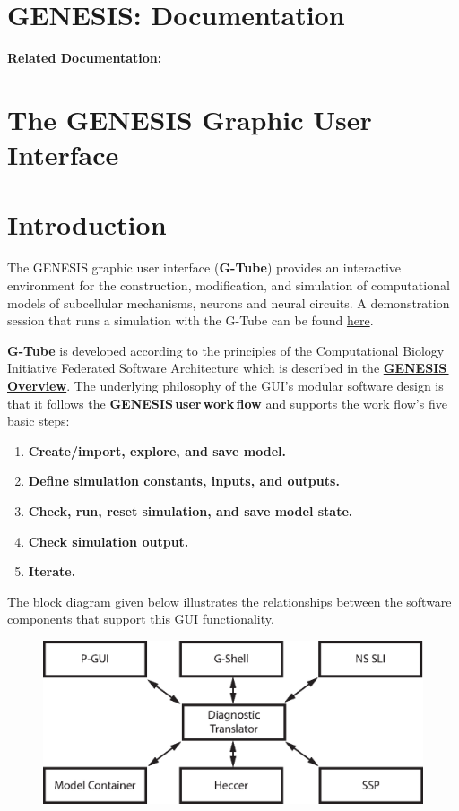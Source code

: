 \documentclass[12pt]{article}
\begin{document}
\section*{GENESIS: Documentation}

{\bf Related Documentation:}

\section*{The GENESIS Graphic User Interface}

\section*{Introduction}

The GENESIS graphic user interface ({\bf G-Tube}) provides an
interactive environment for the construction, modification, and
simulation of computational models of subcellular mechanisms, neurons
and neural circuits.  A demonstration session that runs a simulation
with the G-Tube can be found
\href{../gtube-demo/gtube-demo.html}{here}.

{\bf G-Tube} is developed according to the principles of the Computational Biology Initiative Federated Software Architecture which is described in the \href{../genesis-overview/genesis-overview.tex}{\bf GENESIS\,Overview}. The underlying philosophy of the GUI's modular software design is that it follows the \href{../workflow-intro/workflow-intro.tex}{\bf GENESIS\,user\,work\,flow} and supports the work flow's five basic steps:
\begin{enumerate}
\item {\bf Create/import, explore, and save model.}
\item {\bf Define simulation constants, inputs, and outputs.}
\item {\bf Check, run, reset simulation, and save model state.}
\item {\bf Check simulation output.}
\item {\bf Iterate.}
\end{enumerate}
The block diagram given below illustrates the relationships between the software components that support this GUI functionality.

\begin{figure}[h]
  \centering
\includegraphics[scale=0.6]{figures/gui-isolated.eps}
  \label{fig:df-1}
\end{figure}
\end{document}
